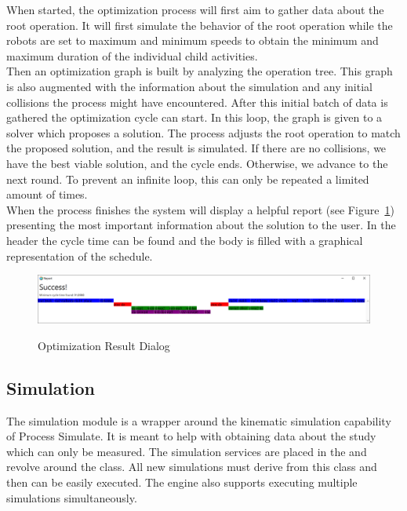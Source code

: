 When started, the optimization process will first aim to gather data about the root operation. It will first simulate the behavior of the root operation while the robots are set to maximum and minimum speeds to obtain the minimum and maximum duration of the individual child activities.\\

Then an optimization graph is built by analyzing the operation tree. This graph is also augmented with the information about the simulation and any initial collisions the process might have encountered. After this initial batch of data is gathered the optimization cycle can start. In this loop, the graph is given to a solver which proposes a solution. The process adjusts the root operation to match the proposed solution, and the result is simulated. If there are no collisions, we have the best viable solution, and the cycle ends. Otherwise, we advance to the next round. To prevent an infinite loop, this can only be repeated a limited amount of times. \\

When the process finishes the system will display a helpful report (see Figure~\ref{fig:DialogOptimizationResult}) presenting the most important information about the solution to the user. In the header the cycle time can be found and the body is filled with a graphical representation of the schedule.  

\begin{figure}[H]
	\caption{Optimization Result Dialog}
	\centering
	\includegraphics[width=\textwidth]{dialog_optimizationresult}
	\label{fig:DialogOptimizationResult}
\end{figure}

\subsection{Simulation}

The simulation module is a wrapper around the kinematic simulation capability of Process Simulate. It is meant to help with obtaining data about the study which can only be measured. The simulation services are placed in the  and revolve around the  class. All new simulations must derive from this class and then can be easily executed. The engine also supports executing multiple simulations simultaneously. \\

